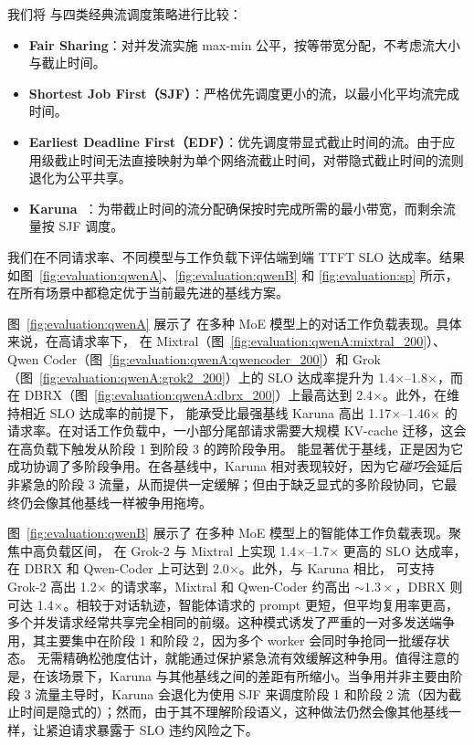  我们将 \sys{} 与四类经典流调度策略进行比较：
\begin{itemize}[leftmargin=*]
    \item \textbf{Fair Sharing}：对并发流实施 max-min 公平，按等带宽分配，不考虑流大小与截止时间。
    \item \textbf{Shortest Job First（SJF）}：严格优先调度更小的流，以最小化平均流完成时间。
    \item \textbf{Earliest Deadline First（EDF）}：优先调度带显式截止时间的流。由于应用级截止时间无法直接映射为单个网络流截止时间，对带隐式截止时间的流则退化为公平共享。
    \item \textbf{Karuna~\cite{karuna}}：为带截止时间的流分配确保按时完成所需的最小带宽，而剩余流量按 SJF 调度。
\end{itemize}

 我们在不同请求率、不同模型与工作负载下评估端到端 TTFT SLO 达成率。结果如图~\ref{fig:evaluation:qwenA}、\ref{fig:evaluation:qwenB} 和 \ref{fig:evaluation:sp} 所示，\sys{} 在所有场景中都稳定优于当前最先进的基线方案。

图~\ref{fig:evaluation:qwenA} 展示了 \sys{} 在多种 MoE 模型上的对话工作负载表现。具体来说，在高请求率下，\sys{} 在 Mixtral（图~\ref{fig:evaluation:qwenA:mixtral_200}）、Qwen Coder（图~\ref{fig:evaluation:qwenA:qwencoder_200}）和 Grok（图~\ref{fig:evaluation:qwenA:grok2_200}）上的 SLO 达成率提升为 1.4$\times$--1.8$\times$，而在 DBRX（图~\ref{fig:evaluation:qwenA:dbrx_200}）上最高达到 2.4$\times$。此外，在维持相近 SLO 达成率的前提下，\sys{} 能承受比最强基线 Karuna 高出 1.17$\times$--1.46$\times$ 的请求率。在对话工作负载中，一小部分尾部请求需要大规模 KV-cache 迁移，这会在高负载下触发从阶段 1 到阶段 3 的跨阶段争用。\sys{} 能显著优于基线，正是因为它成功协调了多阶段争用。在各基线中，Karuna 相对表现较好，因为它\emph{碰巧}会延后非紧急的阶段 3 流量，从而提供一定缓解；但由于缺乏显式的多阶段协同，它最终仍会像其他基线一样被争用拖垮。

图~\ref{fig:evaluation:qwenB} 展示了 \sys{} 在多种 MoE 模型上的智能体工作负载表现。聚焦中高负载区间，\sys{} 在 Grok-2 与 Mixtral 上实现 1.4$\times$--1.7$\times$ 更高的 SLO 达成率，在 DBRX 和 Qwen-Coder 上可达到 2.0$\times$。此外，与 Karuna 相比，\sys{} 可支持 Grok-2 高出 1.2$\times$ 的请求率，Mixtral 和 Qwen-Coder 约高出 $\sim1.3\times$，DBRX 则可达 1.4$\times$。相较于对话轨迹，智能体请求的 prompt 更短，但平均复用率更高，多个并发请求经常共享完全相同的前缀。这种模式诱发了严重的一对多发送端争用，其主要集中在阶段 1 和阶段 2，因为多个 worker 会同时争抢同一批缓存状态。\sys{} 无需精确松弛度估计，就能通过保护紧急流有效缓解这种争用。值得注意的是，在该场景下，Karuna 与其他基线之间的差距有所缩小。当争用并非主要由阶段 3 流量主导时，Karuna 会退化为使用 SJF 来调度阶段 1 和阶段 2 流（因为截止时间是隐式的）；然而，由于其不理解阶段语义，这种做法仍然会像其他基线一样，让紧迫请求暴露于 SLO 违约风险之下。

